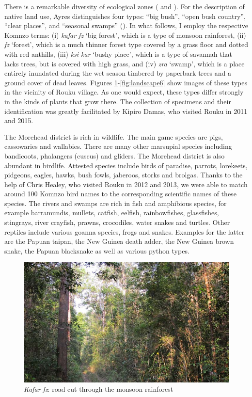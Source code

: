 There is a remarkable diversity of ecological zones (\citealt{Paijmans:1970bl} and \citealt{Paijmans:1971morehead}). For the description of native land use, Ayres distinguishes four  types: ``big bush'', ``open bush country'', ``clear places'', and ``seasonal swamps'' (\citeyear[5]{Ayres:ws}). In what follows, I employ the respective Komnzo terms: (i) \emph{kafar fz} `big forest', which is a type of monsoon rainforest, (ii) \emph{fz} `forest', which is a much thinner forest type covered by a grass floor and dotted with red anthills, (iii) \emph{ksi kar} `bushy place', which is a type of savannah that lacks trees, but is covered with high grass, and (iv) \emph{zra} `swamp', which is a place entirely inundated during the wet season timbered by paperbark trees and a ground cover of dead leaves. Figures \ref{fig:landscape3}-\ref{fig:landscape6} show images of these types in the vicinity of Rouku village. As one would expect, these  types differ strongly in the kinds of plants that grow there. The collection of specimens and their identification was greatly facilitated by Kipiro Damas, who visited Rouku in 2011 and 2015.

The Morehead district is rich in wildlife. The main game species are pigs, cassowaries and wallabies. There are many other marsupial species including bandicoots, phalangers (cuscus) and gliders. The Morehead district is also abundant in birdlife. Attested species include birds of paradise, parrots, lorekeets, pidgeons, eagles, hawks, bush fowls, jaberoos, storks and brolgas. Thanks to the help of Chris Healey, who visited Rouku in 2012 and 2013, we were able to match around 100 Komnzo bird names to the corresponding scientific names of these species. The rivers and swamps are rich in fish and amphibious species, for example barramundis, mullets, catfish, eelfish, rainbowfishes, glassfishes, stingrays, river crayfish, prawns, crocodiles, water snakes and turtles. Other reptiles include various goanna species, frogs and snakes. Examples for the latter are the Papuan taipan, the New Guinea death adder, the New Guinea brown snake, the Papuan blacksnake as well as various python types.

\begin{figure}
    \includegraphics[width=.9\textwidth]{figures/landscape3.jpg}
  \caption[\emph{Kafar fz}: monsoon rainforest (with a road)]{\emph{Kafar fz}: road cut through the monsoon rainforest}
  \label{fig:landscape3}
\end{figure}%

